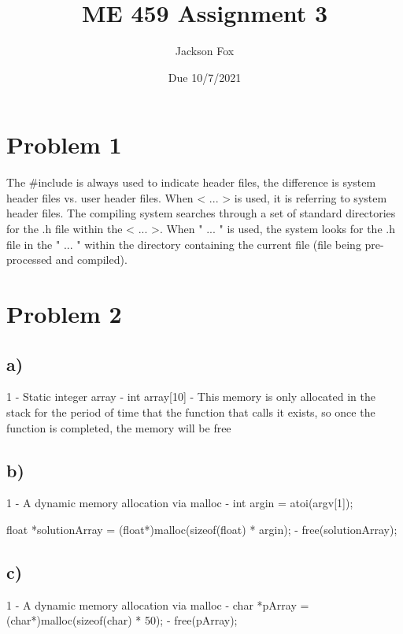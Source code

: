 \documentclass[11pt, oneside]{article}   	%
\title{ME 459 Assignment 3}
\author{Jackson Fox}
\date{Due 10/7/2021}							%
\begin{document}
\maketitle
\section*{Problem 1}

The \#include is always used to indicate header files, the difference is system header files vs. user header files.  When < ... > is used, it is referring to system header files.  The compiling system searches through a set of standard directories for the .h file within the < ... >.  When " ... " is used, the system looks for the .h file in the " ... " within the directory containing the current file (file being pre-processed and compiled).

\section*{Problem 2}

	\subsection*{a)}
	
		1 - Static integer array
		 - int array[10]
		 - This memory is only allocated in the stack for the period of time that the function that calls it exists, so once the function is completed, the 	memory will be free
	
	\subsection*{b)}
		1 - A dynamic memory allocation via malloc
		 - int argin = atoi(argv[1]);
	
		float *solutionArray = (float*)malloc(sizeof(float) * argin);
		 - free(solutionArray);
	\subsection*{c)}
		1 - A dynamic memory allocation via malloc
		 - char *pArray = (char*)malloc(sizeof(char) * 50);
		 - free(pArray);
\end{document}
